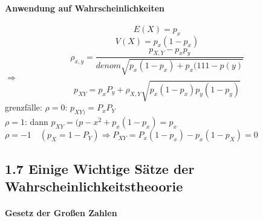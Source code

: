 \documentclass[a4paper]{article}
\theoremstyle{definition}
\theoremstyle{remark}
\begin{document}
\paragraph{Anwendung auf Wahrscheinlichkeiten}
\label{par:anwendung_auf_wahrscheinlichkeiten}
\begin{equation}
  E(X)=p_x
\end{equation}
\begin{equation}
  V(X)= p_x(1-p_x)
\end{equation}
 \begin{equation}
   \rho_{x,y}=\frac{p_{X,Y}-p_xp_y}{denom\sqrt{p_x(1-p_x)+p_x(111-p(y)}}
 \end{equation}
$\Rightarrow$
\begin{equation}
  p_{XY}=p_xP_y+\rho _{X,Y}\sqrt{p_x(1-p_x)p_y(1-p_y)}
\end{equation}
grenzfälle:
$\rho =0$: $ p_{XY)}=P_xP_Y$\\ 
$\rho =1$: dann $p_{XY}=(p-x^2+p_x(1-p_x)=p_x$\\
  $  \rho =-1\quad (p_X=1-P_Y) \Rightarrow P_{XY}=P_x(1-p_x)-p_x(1-p_X)=0$
  \subsection{1.7 Einige Wichtige Sätze der Wahrscheinlichkeitstheoorie}
 \label{sub:1_7_einige_wichtige_satze_der_wahrscheinlichkeitstheoorie}
 
\paragraph{Gesetz  der Großen Zahlen}
\label{par:gesetz_der_grossen_zahlen}
\end{document}
